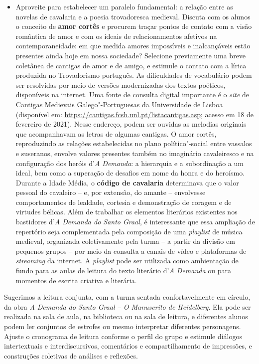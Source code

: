 \documentclass[11pt]{extarticle}
\begin{document}
\begin{itemize}
\item
  Aproveite para estabelecer um paralelo fundamental: a relação entre as
  novelas de cavalaria e a poesia trovadoresca medieval. Discuta com os
  alunos o conceito de \textbf{amor cortês} e procurem traçar pontos de
  contato com a visão romântica de amor e com os ideais de
  relacionamentos afetivos na contemporaneidade: em que medida amores
  impossíveis e inalcançáveis estão presentes ainda hoje em nossa
  sociedade? Selecione previamente uma breve coletânea de cantigas de
  amor e de amigo, e estimule o contato com a lírica produzida no
  Trovadorismo português. As dificuldades de vocabulário podem ser
  resolvidas por meio de versões modernizadas dos textos poéticos,
  disponíveis na internet. Uma fonte de consulta digital importante é o
  \emph{site} de Cantigas Medievais Galego"-Portuguesas da Universidade
  de Lisboa (disponível em:
  \url{https://cantigas.fcsh.unl.pt/listacantigas.asp}; acesso em 18 de
  fevereiro de 2021). Nesse endereço, podem ser ouvidas as melodias
  originais que acompanhavam as letras de algumas cantigas. O amor
  cortês, reproduzindo as relações estabelecidas no plano
  político"-social entre vassalos e suseranos, envolve valores presentes
  também no imaginário cavaleiresco e na configuração dos heróis
  d'\emph{A Demanda}: a hierarquia e a subordinação a um ideal, bem como
  a superação de desafios em nome da honra e do heroísmo. Durante a
  Idade Média, o \textbf{código de cavalaria} determinava que o valor
  pessoal do cavaleiro -- e, por extensão, do amante -- envolvesse
  comportamentos de lealdade, cortesia e demonstração de coragem e de
  virtudes bélicas. Além de trabalhar os elementos literários existentes
  nos bastidores d'\emph{A Demanda do Santo Graal}, é interessante que
  essa ampliação de repertório seja complementada pela composição de uma
  \emph{playlist} de música medieval, organizada coletivamente pela
  turma -- a partir da divisão em pequenos grupos -- por meio da
  consulta a canais de vídeo e plataformas de \emph{streaming} da
  internet. A \emph{playlist} pode ser utilizada como ambientação de
  fundo para as aulas de leitura do texto literário d'\emph{A Demanda}
  ou para momentos de escrita criativa e literária.
\end{itemize}

Sugerimos a leitura conjunta, com a turma sentada
confortavelmente em círculo, da obra \emph{A Demanda do Santo Graal -- O
Manuscrito de Heidelberg}. Ela pode ser realizada na sala de aula, na
biblioteca ou na sala de leitura, e diferentes alunos podem ler
conjuntos de estrofes ou mesmo interpretar diferentes personagens.
Ajuste o cronograma de leitura conforme o perfil do grupo e estimule
diálogos intertextuais e interdiscursivos, comentários e
compartilhamento de impressões, e construções coletivas de análises e
reflexões.
\end{document}

